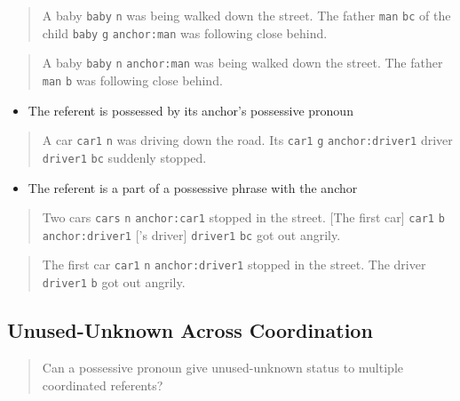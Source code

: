 \documentclass[
]{book}
\providecommand{\tightlist}{%
  \setlength{\itemsep}{0pt}\setlength{\parskip}{0pt}}
\begin{document}
\begin{quote}
A baby \texttt{baby} \texttt{n} was being walked down the street.
The father \texttt{man} \texttt{bc} of the child \texttt{baby} \texttt{g} \texttt{anchor:man} was following close behind.
\end{quote}

\begin{quote}
A baby \texttt{baby} \texttt{n} \texttt{anchor:man} was being walked down the street.
The father \texttt{man} \texttt{b} was following close behind.
\end{quote}

\begin{itemize}
\tightlist
\item
  The referent is possessed by its anchor's possessive pronoun
\end{itemize}

\begin{quote}
A car \texttt{car1} \texttt{n} was driving down the road.
Its \texttt{car1} \texttt{g} \texttt{anchor:driver1} driver \texttt{driver1} \texttt{bc} suddenly stopped.
\end{quote}

\begin{itemize}
\tightlist
\item
  The referent is a part of a possessive phrase with the anchor
\end{itemize}

\begin{quote}
Two cars \texttt{cars} \texttt{n} \texttt{anchor:car1} stopped in the street.
{[}The first car{]} \texttt{car1} \texttt{b} \texttt{anchor:driver1}
{[}'s driver{]} \texttt{driver1} \texttt{bc} got out angrily.
\end{quote}

\begin{quote}
The first car \texttt{car1} \texttt{n} \texttt{anchor:driver1} stopped in the street.
The driver \texttt{driver1} \texttt{b} got out angrily.
\end{quote}

\hypertarget{unused-unknown-across-coordination}{%
\subsection{Unused-Unknown Across Coordination}\label{unused-unknown-across-coordination}}

\begin{quote}
Can a possessive pronoun give unused-unknown status to multiple coordinated referents?
\end{quote}
\end{document}
